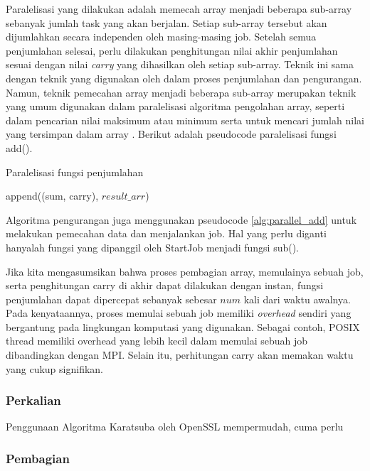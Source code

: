 
Paralelisasi yang dilakukan adalah memecah array menjadi beberapa sub-array sebanyak jumlah task yang akan berjalan. Setiap sub-array tersebut akan dijumlahkan secara independen oleh masing-masing job. Setelah semua penjumlahan selesai, perlu dilakukan penghitungan nilai akhir penjumlahan sesuai dengan nilai \textit{carry} yang dihasilkan oleh setiap sub-array. Teknik ini sama dengan teknik yang digunakan oleh \citet{gpu_bignum} dalam proses penjumlahan dan pengurangan. Namun, teknik pemecahan array menjadi beberapa sub-array merupakan teknik yang umum digunakan dalam paralelisasi algoritma pengolahan array, seperti dalam pencarian nilai maksimum atau minimum serta untuk mencari jumlah nilai yang tersimpan dalam array \citep{intro_parallel}. Berikut adalah pseudocode paralelisasi fungsi add().

\begin{algorithm}
  \caption{Paralelisasi fungsi penjumlahan}
  \label{alg:parallel_add}
  \begin{algorithmic}[1]
    \Statex
          \State append((sum, carry), $result\_arr$)
      \EndFor
      \State {}
    \EndFunction
  \end{algorithmic}
\end{algorithm}

Algoritma pengurangan juga menggunakan pseudocode \ref{alg:parallel_add} untuk melakukan pemecahan data dan menjalankan job. Hal yang perlu diganti hanyalah fungsi yang dipanggil oleh StartJob menjadi fungsi sub().

Jika kita mengasumsikan bahwa proses pembagian array, memulainya sebuah job, serta penghitungan carry di akhir dapat dilakukan dengan instan, fungsi penjumlahan dapat dipercepat sebanyak sebesar $num$ kali dari waktu awalnya. Pada kenyataannya, proses memulai sebuah job memiliki \textit{overhead} sendiri yang bergantung pada lingkungan komputasi yang digunakan. Sebagai contoh, POSIX thread memiliki overhead yang lebih kecil dalam memulai sebuah job dibandingkan dengan MPI. Selain itu, perhitungan carry akan memakan waktu yang cukup signifikan.


\subsubsection{Perkalian}

Penggunaan Algoritma Karatsuba oleh OpenSSL mempermudah, cuma perlu

\subsubsection{Pembagian}\label{sec:div_parallel}
